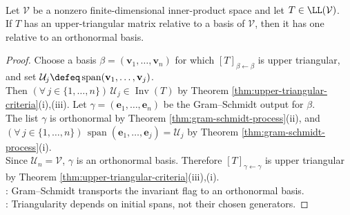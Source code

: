 \begin{corollary} \label{cor:upper-triangular-orthonormal-basis} \\
Let $\mathcal{V}$ be a nonzero finite-dimensional inner-product space and let $T\in\LL(\mathcal{V})$.\\
If $T$ has an upper-triangular matrix relative to a basis of $\mathcal{V}$, then it has one relative to an orthonormal basis.
\begin{proof}
Choose a basis $\beta=(\mathbf{v}_1,\ldots,\mathbf{v}_n)$ for which $[T]_{\beta\leftarrow\beta}$ is upper triangular, and set $\mathcal{U}_j\defeq\operatorname{span}(\mathbf{v}_1,\ldots,\mathbf{v}_j)$.\\
Then $(\forall\,j\in\{1,\ldots,n\})\,\mathcal{U}_j\in\operatorname{Inv}(T)$ by Theorem \ref{thm:upper-triangular-criteria}(i),(iii). Let $\gamma=(\mathbf{e}_1,\ldots,\mathbf{e}_n)$ be the Gram--Schmidt output for $\beta$.\\
The list $\gamma$ is orthonormal by Theorem \ref{thm:gram-schmidt-process}(ii), and $(\forall\,j\in\{1,\ldots,n\})\,\operatorname{span}(\mathbf{e}_1,\ldots,\mathbf{e}_j)=\mathcal{U}_j$ by Theorem \ref{thm:gram-schmidt-process}(i).\\
Since $\mathcal{U}_n=\mathcal{V}$, $\gamma$ is an orthonormal basis. Therefore $[T]_{\gamma\leftarrow\gamma}$ is upper triangular by Theorem \ref{thm:upper-triangular-criteria}(iii),(i).\\
: Gram--Schmidt transports the invariant flag to an orthonormal basis.\\
: Triangularity depends on initial spans, not their chosen generators.
\end{proof}
\end{corollary}

